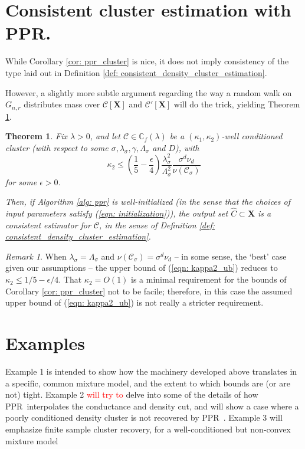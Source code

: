 \documentclass{article}
\newcommand{\1}{\mathbf{1}}
\newcommand{\Xbf}{\mathbf{X}}
\newcommand{\Cbb}{\mathbb{C}}
\newcommand{\Cset}{\mathcal{C}}
\newcommand{\Csig}{\Cset_{\sigma}}
\newcommand{\pprspace}{{\sc PPR~}}
\theoremstyle{aldenthm}
\newtheorem{theorem}{Theorem}
\theoremstyle{remark}
\newtheorem{remark}{Remark}
\begin{document}
\section{Consistent cluster estimation with PPR.}
\label{sec: consistent_cluster_estimation_with_ppr}
While Corollary \ref{cor: ppr_cluster} is nice, it does not imply consistency of the type laid out in Definition \ref{def: consistent_density_cluster_estimation}.

However, a slightly more subtle argument regarding the way a random walk on $G_{n,r}$ distributes mass over $\Cset[\Xbf]$ and $\Cset'[\Xbf]$ will do the trick, yielding Theorem \ref{thm: consistent_recovery_of_density_clusters}. 
\begin{theorem}
\label{thm: consistent_recovery_of_density_clusters}
Fix $\lambda > 0$, and let $\Cset \in \Cbb_f(\lambda)$ be a $(\kappa_1,\kappa_2)$-well conditioned cluster (with respect to some $\sigma, \lambda_{\sigma}, \gamma, \Lambda_{\sigma}$ and $D$), with
\begin{equation}
\label{eqn: kappa2_ub}
\kappa_2 \leq \left(\frac{1}{5} - \frac{\epsilon}{4}\right) \frac{\lambda_{\sigma}^2}{\Lambda_{\sigma}^2} \frac{\sigma^d \nu_d}{\nu(\Csig)}
\end{equation}
for some $\epsilon > 0$.

Then, if Algorithm \ref{alg: ppr} is well-initialized (in the sense that the choices of input parameters satisfy (\ref{eqn: initialization})), the output set $\widehat{C} \subset \Xbf$ is a consistent estimator for $\Cset$, in the sense of Definition \ref{def: consistent_density_cluster_estimation}.
\end{theorem}

\begin{remark}
	When $\lambda_{\sigma} = \Lambda_{\sigma}$ and $\nu(\Csig) = \sigma^d \nu_d$ -- in some sense, the `best' case given our assumptions -- the upper bound of (\ref{eqn: kappa2_ub}) reduces to $\kappa_2 \leq 1/5 - \epsilon/4$. That $\kappa_2 = O(1)$ is a minimal requirement for the bounds of Corollary \ref{cor: ppr_cluster} not to be facile; therefore, in this case the assumed upper bound of (\ref{eqn: kappa2_ub}) is not really a stricter requirement.
\end{remark}
\section{Examples}
\label{section: examples}

Example 1 is intended to show how the machinery developed above translates in a specific, common mixture model, and the extent to which bounds are (or are not) tight.  Example 2 \textcolor{red}{will try to} delve into some of the details of how \pprspace interpolates the conductance and density cut, and will show a case where a poorly conditioned density cluster is not recovered by \pprspace. Example 3 will emphasize finite sample cluster recovery, for a well-conditioned but non-convex mixture model
\end{document}

